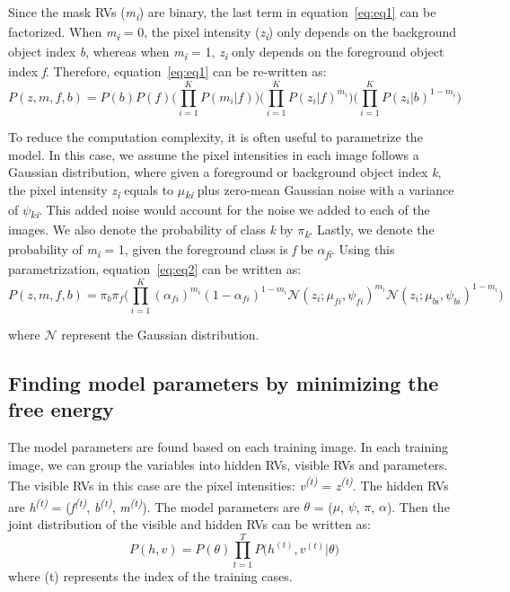 \documentclass{article} %
\begin{document}
Since the mask RVs (\textit{m}\textsubscript{\textit{i}}) are binary, the last term in equation~\ref{eq:eq1} can be factorized. When \textit{m}\textsubscript{\textit{i}} = 0, the pixel intensity (\textit{z}\textsubscript{\textit{i}}) only depends on the background object index \textit{b}, whereas when \textit{m}\textsubscript{\textit{i}} = 1, \textit{z}\textsubscript{\textit{i}} only depends on the foreground object index \textit{f}. Therefore, equation~\ref{eq:eq1} can be re-written as:
\begin{equation}
P(z,m,f,b) = P(b)P(f)\Bigg( \prod_{i=1}^KP(m_{i}|f)\Bigg)\Bigg( \prod_{i=1}^KP(z_{i}|f)^{m_{i}}\Bigg)\Bigg( \prod_{i=1}^KP(z_{i}|b)^{1-m_{i}}\Bigg)
\label{eq:eq2}
\end{equation}

To reduce the computation complexity, it is often useful to parametrize the model. In this case, we assume the pixel intensities in each image follows a Gaussian distribution, where given a foreground or background object index \textit{k}, the pixel intensity \textit{z}\textsubscript{\textit{i}} equals to \textit{$\mu$}\textsubscript{\textit{ki}} plus zero-mean Gaussian noise with a variance of \textit{$\psi$}\textsubscript{\textit{ki}}. This added noise would account for the noise we added to each of the images. We also denote the probability of class \textit{k} by \textit{$\pi$}\textsubscript{\textit{k}}. Lastly, we denote the probability of \textit{m}\textsubscript{\textit{i}} = 1, given the foreground class is \textit{f} be \textit{$\alpha$}\textsubscript{\textit{fi}}. Using this parametrization, equation~\ref{eq:eq2} can be written as:
\begin{equation}
P(z,m,f,b) = \pi_{b} \pi_{f} \Bigg( \prod_{i=1}^K {(\alpha_{fi})}^{m_{i}} {(1-\alpha_{fi})}^{1-m_{i}} \mathcal{N}(z_i;\mu_{fi},\psi_{fi})^{m_{i}}\mathcal{N}(z_i;\mu_{bi},\psi_{bi})^{1-m_{i}} \Bigg)
\label{eq:eq3}
\end{equation}

where $\mathcal{N}$ represent the Gaussian distribution. 

\subsection{Finding model parameters by minimizing the free energy}
\label{free_energy}
The model parameters are found based on each training image. In each training image, we can group the variables into hidden RVs, visible RVs and parameters. The visible RVs in this case are the pixel intensities: \textit{v}\textsuperscript{\textit{(t)}} = \textit{z}\textsuperscript{\textit{(t)}}. The hidden RVs are \textit{h}\textsuperscript{\textit{(t)}} = (\textit{f}\textsuperscript{\textit{(t)}}, \textit{b}\textsuperscript{\textit{(t)}}, \textit{m}\textsuperscript{\textit{(t)}}). The model parameters are \textit{$\theta$} = (\textit{$\mu$}, \textit{$\psi$}, \textit{$\pi$}, \textit{$\alpha$}). Then the joint distribution of the visible and hidden RVs can be written as:
\begin{equation}
P(h,v) = P(\theta) \prod_{t=1}^TP\Big(h^{(t)}, v^{(t)}|\theta\Big) 
\label{eq:eq4}
\end{equation}
where (t) represents the index of the training cases.
\end{document}
